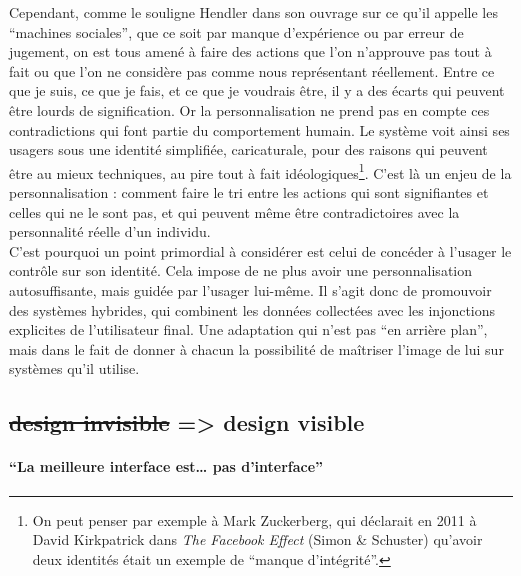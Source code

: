 \documentclass[]{article}
\let\oldparagraph\paragraph
\renewcommand{\paragraph}[1]{\oldparagraph{#1}\mbox{}}
\begin{document}
Cependant, comme le souligne Hendler dans son ouvrage sur ce qu'il
appelle les ``machines sociales'', que ce soit par manque d'expérience
ou par erreur de jugement, on est tous amené à faire des actions que
l'on n'approuve pas tout à fait ou que l'on ne considère pas comme nous
représentant réellement. Entre ce que je suis, ce que je fais, et ce que
je voudrais être, il y a des écarts qui peuvent être lourds de
signification. Or la personnalisation ne prend pas en compte ces
contradictions qui font partie du comportement humain. Le système voit
ainsi ses usagers sous une identité simplifiée, caricaturale, pour des
raisons qui peuvent être au mieux techniques, au pire tout à fait
idéologiques\footnote{On peut penser par exemple à Mark Zuckerberg, qui
  déclarait en 2011 à David Kirkpatrick dans \emph{The Facebook Effect}
  (Simon \& Schuster) qu'avoir deux identités était un exemple de
  ``manque d'intégrité''.}. C'est là un enjeu de la personnalisation :
comment faire le tri entre les actions qui sont signifiantes et celles
qui ne le sont pas, et qui peuvent même être contradictoires avec la
personnalité réelle d'un individu.\\

C'est pourquoi un point primordial à considérer est celui de concéder à
l'usager le contrôle sur son identité. Cela impose de ne plus avoir une
personnalisation autosuffisante, mais guidée par l'usager lui-même. Il
s'agit donc de promouvoir des systèmes hybrides, qui combinent les
données collectées avec les injonctions explicites de l'utilisateur
final. Une adaptation qui n'est pas ``en arrière plan'', mais dans le
fait de donner à chacun la possibilité de maîtriser l'image de lui sur
systèmes qu'il utilise.

\newpage

\hypertarget{design-invisible-design-visible}{%
\subsection{\texorpdfstring{\sout{design invisible} =\textgreater{}
design
visible}{design invisible =\textgreater{} design visible}}\label{design-invisible-design-visible}}

\hypertarget{la-meilleure-interface-est-pas-dinterface}{%
\paragraph{``La meilleure interface est\ldots{} pas
d'interface''}\label{la-meilleure-interface-est-pas-dinterface}}
\end{document}
